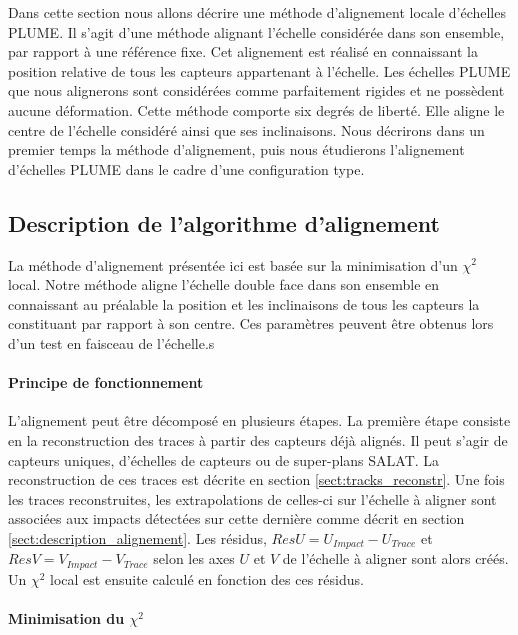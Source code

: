    Dans cette section nous allons d\'ecrire une m\'ethode d'alignement locale d'échelles PLUME. Il s'agit d'une m\'ethode alignant l'\'echelle consid\'er\'ee dans son ensemble, par rapport \`a une r\'ef\'erence fixe. Cet alignement est r\'ealis\'e en connaissant la position relative de tous les capteurs appartenant \`a l'\'echelle. Les \'echelles PLUME que nous alignerons sont consid\'er\'ees comme parfaitement rigides et ne poss\`edent aucune d\'eformation. Cette m\'ethode comporte six degr\'es de libert\'e. Elle aligne le centre de l'\'echelle consid\'er\'e ainsi que ses inclinaisons. Nous d\'ecrirons dans un premier temps la m\'ethode d'alignement, puis nous \'etudierons l'alignement d'\'echelles PLUME dans le cadre d'une configuration type.
   
   \subsection{Description de l'algorithme d'alignement}
   
   La m\'ethode d'alignement pr\'esent\'ee ici est bas\'ee sur la minimisation d'un $\chi^2$ local. Notre m\'ethode aligne l'\'echelle double face dans son ensemble en connaissant au pr\'ealable la position et les inclinaisons de tous les capteurs la constituant par rapport \`a son centre. Ces param\`etres peuvent \^etre obtenus lors d'un test en faisceau de l'\'echelle.s
   
   \paragraph{Principe de fonctionnement}
   
   L'alignement peut \^etre d\'ecompos\'e en plusieurs \'etapes. La premi\`ere \'etape consiste en la reconstruction des traces \`a partir des capteurs d\'ej\`a align\'es. Il peut s'agir de capteurs uniques, d'\'echelles de capteurs ou de super-plans SALAT. La reconstruction de ces traces est d\'ecrite en section \ref{sect:tracks_reconstr}. Une fois les traces reconstruites, les extrapolations de celles-ci sur l'\'echelle \`a aligner sont associ\'ees aux impacts d\'etect\'ees sur cette derni\`ere comme d\'ecrit en section \ref{sect:description_alignement}. Les r\'esidus, $ResU = U_{Impact} - U_{Trace}$ et $ResV = V_{Impact} - V_{Trace}$ selon les axes $U$ et $V$ de l'\'echelle \`a aligner sont alors cr\'e\'es. Un $\chi^2$ local est ensuite calcul\'e en fonction des ces r\'esidus.
   
   \paragraph{Minimisation du $\chi^2$}
   
